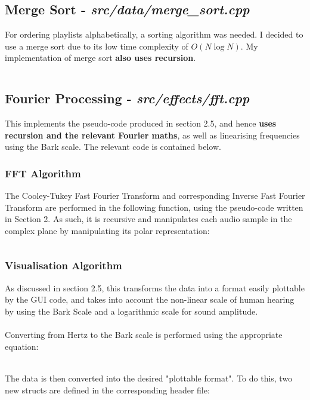 \pagebreak
\subsection{Merge Sort - \textit{src/data/merge\_sort.cpp}}
For ordering playlists alphabetically, a sorting  algorithm was needed. I decided to use a merge sort due to its low time complexity of \(O(N \log{N})\). My implementation of merge sort \textbf{also uses recursion}.
\inputminted[linenos]{c++}{../src/data/merge_sort.cpp}

\pagebreak
\subsection{Fourier Processing - \textit{src/effects/fft.cpp}}
This implements the pseudo-code produced in section 2.5, and hence \textbf{uses recursion and the relevant Fourier maths}, as well as linearising frequencies using the Bark scale. The relevant code is contained below.

\subsubsection{FFT Algorithm}
The Cooley-Tukey Fast Fourier Transform and corresponding Inverse Fast Fourier Transform are performed in the following function, using the pseudo-code written in Section 2. As such, it is recursive and manipulates each audio sample in the complex plane by manipulating its polar representation:
\inputminted[linenos, firstline=49, lastline=81]{c++}{../src/effects/fft.cpp}

\pagebreak
\subsubsection{Visualisation Algorithm}
As discussed in section 2.5, this transforms the data into a format easily plottable by the GUI code, and takes into account the non-linear scale of human hearing by using the Bark Scale and  a logarithmic scale for sound amplitude.

\paragraph{}
Converting from Hertz to the Bark scale is performed using the appropriate equation:
\inputminted[linenos, firstline=150, lastline=156]{c++}{../src/effects/fft.cpp}

\paragraph{}
The data is then converted into the desired "plottable format". To do this, two new structs are defined in the corresponding header file:
\inputminted[linenos, firstline=16, lastline=29]{c++}{../include/effects/fft.h}

